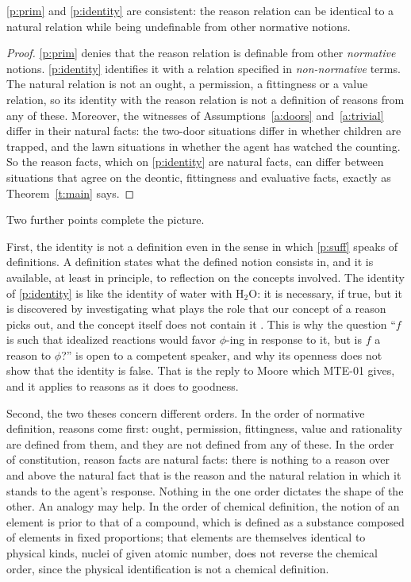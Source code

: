 \documentclass{situationist-preprint}
\begin{document}
\begin{proposition}[Compatibility]\label{p:compat}
\ref{p:prim} and \ref{p:identity} are consistent: the reason relation can be identical to a natural relation while being undefinable from other normative notions.
\end{proposition}

\begin{proof}
\ref{p:prim} denies that the reason relation is definable from other \emph{normative} notions. \ref{p:identity} identifies it with a relation specified in \emph{non-normative} terms. The natural relation is not an ought, a permission, a fittingness or a value relation, so its identity with the reason relation is not a definition of reasons from any of these. Moreover, the witnesses of Assumptions~\ref{a:doors} and~\ref{a:trivial} differ in their natural facts: the two-door situations differ in whether children are trapped, and the lawn situations in whether the agent has watched the counting. So the reason facts, which on \ref{p:identity} are natural facts, can differ between situations that agree on the deontic, fittingness and evaluative facts, exactly as Theorem~\ref{t:main} says.
\end{proof}

Two further points complete the picture.

First, the identity is not a definition even in the sense in which \ref{p:suff} speaks of definitions. A definition states what the defined notion consists in, and it is available, at least in principle, to reflection on the concepts involved. The identity of \ref{p:identity} is like the identity of water with H$_2$O: it is necessary, if true, but it is discovered by investigating what plays the role that our concept of a reason picks out, and the concept itself does not contain it \citep{Boyd1988,Brink1989}. This is why the question \enquote{$f$ is such that idealized reactions would favor $\phi$-ing in response to it, but is $f$ a reason to $\phi$?} is open to a competent speaker, and why its openness does not show that the identity is false. That is the reply to Moore which MTE-01 gives, and it applies to reasons as it does to goodness.

Second, the two theses concern different orders. In the order of normative definition, reasons come first: ought, permission, fittingness, value and rationality are defined from them, and they are not defined from any of these. In the order of constitution, reason facts are natural facts: there is nothing to a reason over and above the natural fact that is the reason and the natural relation in which it stands to the agent's response. Nothing in the one order dictates the shape of the other. An analogy may help. In the order of chemical definition, the notion of an element is prior to that of a compound, which is defined as a substance composed of elements in fixed proportions; that elements are themselves identical to physical kinds, nuclei of given atomic number, does not reverse the chemical order, since the physical identification is not a chemical definition.
\end{document}
